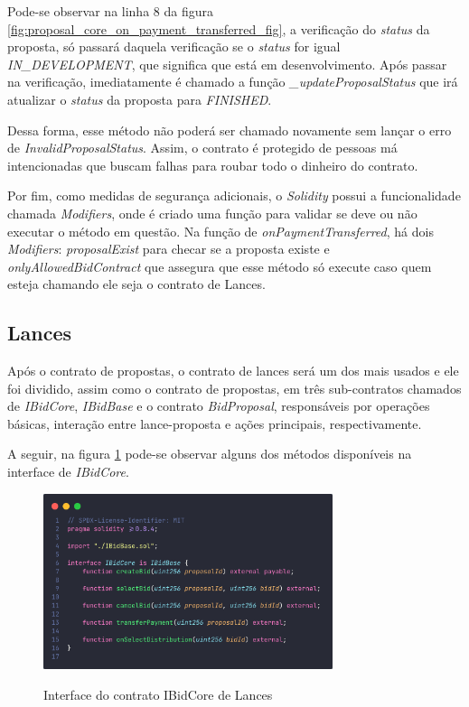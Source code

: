 Pode-se observar na linha 8 da figura \ref{fig:proposal_core_on_payment_transferred_fig}, a verificação do \textit{status} da proposta, só passará daquela verificação se o \textit{status} for igual \textit{IN\_DEVELOPMENT}, que significa que está em desenvolvimento. Após passar na verificação, imediatamente é chamado a função \textit{\_updateProposalStatus} que irá atualizar o \textit{status} da proposta para \textit{FINISHED}.

Dessa forma, esse método não poderá ser chamado novamente sem lançar o erro de \textit{InvalidProposalStatus}. Assim, o contrato é protegido de pessoas má intencionadas que buscam falhas para roubar todo o dinheiro do contrato.

Por fim, como medidas de segurança adicionais, o \textit{Solidity} possui a funcionalidade chamada \textit{Modifiers}, onde é criado uma função para validar se deve ou não executar o método em questão. Na função de \textit{onPaymentTransferred}, há dois \textit{Modifiers}: \textit{proposalExist} para checar se a proposta existe e \textit{onlyAllowedBidContract} que assegura que esse método só execute caso quem esteja chamando ele seja o contrato de Lances.

\subsection{Lances}

Após o contrato de propostas, o contrato de lances será um dos mais usados e ele foi dividido, assim como o contrato de propostas, em três sub-contratos chamados de \textit{IBidCore}, \textit{IBidBase} e o contrato \textit{BidProposal}, responsáveis por operações básicas, interação entre lance-proposta e ações principais, respectivamente.

A seguir, na figura \ref{fig:bid_core_contract_fig} pode-se observar alguns dos métodos disponíveis na interface de \textit{IBidCore}.

\begin{figure}[!h]
  \centering
  \caption{Interface do contrato IBidCore de Lances}
  \includegraphics[width=320px]{src/images/contracts/bid_core.png}
  \label{fig:bid_core_contract_fig}
\end{figure}

